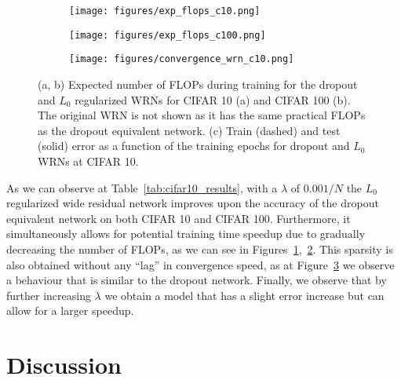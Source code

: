 \documentclass{article} %
\begin{document}
\begin{figure*}[htb!]
    \centering
    \begin{subfigure}[t]{0.36\textwidth}
        \centering
        \texttt{[image: figures/exp\_flops\_c10.png]}
        \caption{}\label{fig:flops_c10}
    \end{subfigure}\hspace{-2em}%
    \begin{subfigure}[t]{0.36\textwidth}
        \centering
        \texttt{[image: figures/exp\_flops\_c100.png]}
        \caption{}\label{fig:flops_c100}
    \end{subfigure}\hspace{-2em}%
    \begin{subfigure}[t]{0.36\textwidth}
        \centering
        \texttt{[image: figures/convergence\_wrn\_c10.png]}
        \caption{}\label{fig:converge_c10}
    \end{subfigure}%
    \caption{(a, b) Expected number of FLOPs during training for the dropout and $L_0$ regularized WRNs for CIFAR 10 (a) and CIFAR 100 (b). The original WRN is not shown as it has the same practical FLOPs as the dropout equivalent network. (c) Train (dashed) and test (solid) error as a function of the training epochs for dropout and $L_0$ WRNs at CIFAR 10.}\label{fig:exp_flops_l0_wrn}
\end{figure*}

As we can observe at Table~\ref{tab:cifar10_results}, with a $\lambda$ of $0.001/N$ the $L_0$ regularized wide residual network improves upon the accuracy of the dropout equivalent network on both CIFAR 10 and CIFAR 100. Furthermore, it simultaneously allows for potential training time speedup due to gradually decreasing the number of FLOPs, as we can see in Figures~\ref{fig:flops_c10},~\ref{fig:flops_c100}. This sparsity is also obtained without any ``lag'' in convergence speed, as at Figure~\ref{fig:converge_c10} we observe a behaviour that is similar to the dropout network. Finally, we observe that by further increasing $\lambda$ we obtain a model that has a slight error increase but can allow for a larger speedup.


\section{Discussion}
\end{document}
